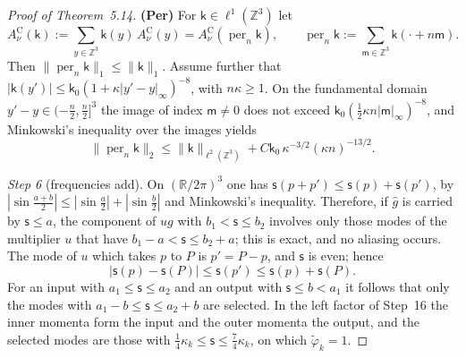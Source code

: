 \documentclass[11pt]{amsart}
\theoremstyle{definition}
\begin{document}
\begin{proof}[Proof of Theorem~5.14]
\textbf{(Per)} For $\mathsf k\in\ell^1(\mathbb Z^3)$ let
\begin{equation*}
A^{\mathrm C}_\nu(\mathsf k):=\sum_{y\in\mathbb Z^3}\mathsf k(y)\,A^{\mathrm C}_\nu(y)=A^{\mathrm C}_\nu(\operatorname{per}_n\mathsf k),\qquad\operatorname{per}_n\mathsf k:=\sum_{\mathsf m\in\mathbb Z^3}\mathsf k(\cdot+n\mathsf m).
\end{equation*}
Then $\|\operatorname{per}_n\mathsf k\|_1\le\|\mathsf k\|_1$.
Assume further that $|\mathsf k(y')|\le\mathsf k_0(1+\kappa|y'-y|_\infty)^{-8}$, with $n\kappa\ge1$.
On the fundamental domain $y'-y\in(-\frac n2,\frac n2]^3$ the image of index $\mathsf m\ne0$ does not exceed $\mathsf k_0(\frac12\kappa n|\mathsf m|_\infty)^{-8}$, and Minkowski's inequality over the images yields
\begin{equation*}
\|\operatorname{per}_n\mathsf k\|_2\le\|\mathsf k\|_{\ell^2(\mathbb Z^3)}+C\mathsf k_0\,\kappa^{-3/2}(\kappa n)^{-13/2}.
\end{equation*}

\emph{Step 6} (frequencies add).
On $(\mathbb R/2\pi)^3$ one has $\mathsf s(p+p')\le\mathsf s(p)+\mathsf s(p')$, by $|\sin\frac{a+b}{2}|\le|\sin\frac a2|+|\sin\frac b2|$ and Minkowski's inequality.
Therefore, if $\hat g$ is carried by $\mathsf s\le a$, the component of $ug$ with $b_1<\mathsf s\le b_2$ involves only those modes of the multiplier $u$ that have $b_1-a<\mathsf s\le b_2+a$;
this is exact, and no aliasing occurs.
The mode of $u$ which takes $p$ to $P$ is $p'=P-p$, and $\mathsf s$ is even;
hence
\begin{equation*}
|\mathsf s(p)-\mathsf s(P)|\le\mathsf s(p')\le\mathsf s(p)+\mathsf s(P).
\end{equation*}
For an input with $a_1\le\mathsf s\le a_2$ and an output with $\mathsf s\le b<a_1$ it follows that only the modes with $a_1-b\le\mathsf s\le a_2+b$ are selected.
In the left factor of Step~16 the inner momenta form the input and the outer momenta the output, and the selected modes are those with $\frac14\kappa_k\le\mathsf s\le\frac74\kappa_k$, on which $\tilde\varphi_k=1$.


\end{proof}
\end{document}
